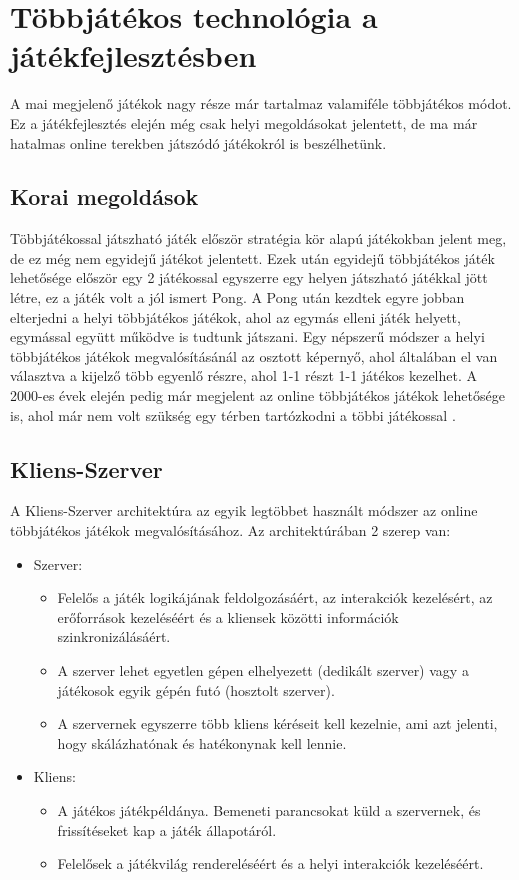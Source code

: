 \documentclass[]{thesis-ekf}
\theoremstyle{definition}
\theoremstyle{remark}
\begin{document}
\section{Többjátékos technológia a játékfejlesztésben}

A mai megjelenő játékok nagy része már tartalmaz valamiféle többjátékos módot. Ez a játékfejlesztés elején még csak helyi megoldásokat jelentett, de ma már hatalmas online terekben játszódó játékokról is beszélhetünk.

\subsection{Korai megoldások}

Többjátékossal játszható játék először stratégia kör alapú játékokban jelent meg, de ez még nem egyidejű játékot jelentett. Ezek után egyidejű többjátékos játék lehetősége először egy 2 játékossal egyszerre egy helyen játszható játékkal jött létre, ez a játék volt a jól ismert Pong. A Pong után kezdtek egyre jobban elterjedni a helyi többjátékos játékok, ahol az egymás elleni játék helyett, egymással együtt működve is tudtunk játszani. Egy népszerű módszer a helyi többjátékos játékok megvalósításánál az osztott képernyő, ahol általában el van választva a kijelző több egyenlő részre, ahol 1-1 részt 1-1 játékos kezelhet. A 2000-es évek elején pedig már megjelent az online többjátékos játékok lehetősége is, ahol már nem volt szükség egy térben tartózkodni a többi játékossal \cite{MediumMultiplayer}.

\subsection{Kliens-Szerver}

A Kliens-Szerver architektúra az egyik legtöbbet használt módszer az online többjátékos játékok megvalósításához. Az architektúrában 2 szerep van:

\begin{itemize}
	\item Szerver:
	\begin{itemize}
		\item Felelős a játék logikájának feldolgozásáért, az interakciók kezelésért, az erőforrások kezeléséért és a kliensek közötti információk szinkronizálásáért.
		\item A szerver lehet egyetlen gépen elhelyezett (dedikált szerver) vagy a játékosok egyik gépén futó (hosztolt szerver).
		\item A szervernek egyszerre több kliens kéréseit kell kezelnie, ami azt jelenti, hogy skálázhatónak és hatékonynak kell lennie.
	\end{itemize}
	\item Kliens:
	\begin{itemize}
		\item A játékos játékpéldánya. Bemeneti parancsokat küld a szervernek, és frissítéseket kap a játék állapotáról.
		\item Felelősek a játékvilág rendereléséért és a helyi interakciók kezeléséért.
	\end{itemize}
\end{itemize}
\end{document}
